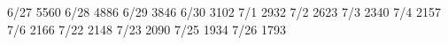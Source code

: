6/27	5560
6/28	4886
6/29	3846
6/30	3102
7/1	2932
7/2	2623
7/3	2340
7/4  2157
7/6  2166
7/22 2148
7/23 2090
7/25 1934
7/26 1793